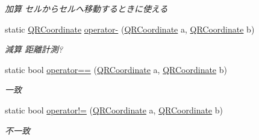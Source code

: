 \begin{DoxyCompactItemize}
\begin{DoxyCompactList}\small\item\em 加算 セルからセルへ移動するときに使える \end{DoxyCompactList}\item 
static \mbox{\hyperlink{struct_hexagonal_map_1_1_domain_1_1_hex_map_1_1_q_r_coordinate}{Q\+R\+Coordinate}} \mbox{\hyperlink{struct_hexagonal_map_1_1_domain_1_1_hex_map_1_1_q_r_coordinate_acf310162a1c57c24dd0a096fe585432e}{operator-\/}} (\mbox{\hyperlink{struct_hexagonal_map_1_1_domain_1_1_hex_map_1_1_q_r_coordinate}{Q\+R\+Coordinate}} a, \mbox{\hyperlink{struct_hexagonal_map_1_1_domain_1_1_hex_map_1_1_q_r_coordinate}{Q\+R\+Coordinate}} b)
\begin{DoxyCompactList}\small\item\em 減算 距離計測? \end{DoxyCompactList}\item 
static bool \mbox{\hyperlink{struct_hexagonal_map_1_1_domain_1_1_hex_map_1_1_q_r_coordinate_a599140a6d544578de04111e2acca247d}{operator==}} (\mbox{\hyperlink{struct_hexagonal_map_1_1_domain_1_1_hex_map_1_1_q_r_coordinate}{Q\+R\+Coordinate}} a, \mbox{\hyperlink{struct_hexagonal_map_1_1_domain_1_1_hex_map_1_1_q_r_coordinate}{Q\+R\+Coordinate}} b)
\begin{DoxyCompactList}\small\item\em 一致 \end{DoxyCompactList}\item 
static bool \mbox{\hyperlink{struct_hexagonal_map_1_1_domain_1_1_hex_map_1_1_q_r_coordinate_a049c5289a33a9d54f7679f530ce79c71}{operator!=}} (\mbox{\hyperlink{struct_hexagonal_map_1_1_domain_1_1_hex_map_1_1_q_r_coordinate}{Q\+R\+Coordinate}} a, \mbox{\hyperlink{struct_hexagonal_map_1_1_domain_1_1_hex_map_1_1_q_r_coordinate}{Q\+R\+Coordinate}} b)
\begin{DoxyCompactList}\small\item\em 不一致 \end{DoxyCompactList}\end{DoxyCompactItemize}
